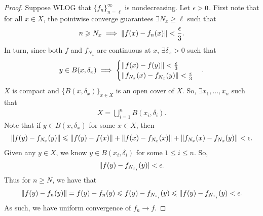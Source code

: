 \documentclass{report}
\begin{document}
\begin{proof}
    Suppose WLOG that $\{f_n\}_{n=\ell}^\infty$ is nondecreasing. Let $\epsilon > 0$. First note that for all $x \in X$, the pointwise converge guarantees $\exists N_x \geq \ell$ such that 
    \begin{align*}
        n \geqslant N_x \implies \Vert f(x) - f_n(x) \Vert < \frac {\epsilon} 3.
    \end{align*}
    In turn, since both $f$ and $f_{N_x}$ are continuous at $x$, $\exists \delta_x > 0$ such that 
    \begin{align*}
        y \in B(x, \delta_x) \implies \begin{cases} \Vert f(x) - f(y)\Vert < \frac {\epsilon} 3 \\
        \Vert f_{N_x}(x) - f_{N_x}(y) \Vert < \frac {\epsilon} 3
        \end{cases}.
    \end{align*}
    $X$ is compact and $\{B(x, \delta_x)\}_{x\in X}$ is an open cover of $X$. So, $\exists x_1, \ldots, x_n$ such that 
    \begin{align*}
        X = \bigcup_{i=1}^n B(x_i, \delta_i).
    \end{align*}
    Note that if $y \in B(x, \delta_x)$ for some $x\in X$, then 
    \begin{align*}
        \Vert f(y) - f_{N_x}(y) \Vert \leqslant \Vert f(y) - f(x) \Vert + \Vert f(x) - f_{N_x}(x) \Vert + \Vert f_{N_x}(x) - f_{N_x}(y) \Vert < \epsilon.
    \end{align*}
    Given any $y \in X$, we know $y \in B(x_i, \delta_i)$ for some $1 \leq i \leq n$. So, 
    \begin{align*}
        \Vert f(y) - f_{N_{x_i}}(y)| < \epsilon.
    \end{align*} 
    Thus for $n \geq N$, we have that 
    \begin{align*}
        \Vert f(y) - f_n(y) \Vert = f(y) - f_{n}(y) \leqslant f(y) - f_{N_{x_i}}(y) \leqslant \Vert f(y) - f_{N_{x_i}}(y) < \epsilon. 
    \end{align*}
    As such, we have uniform convergence of $f_n \to f$. 
\end{proof}
\end{document}
